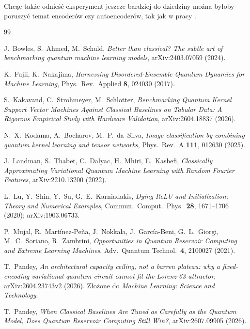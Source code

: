 \documentclass[11pt, a4paper]{article}
\begin{document}
Chcąc także odnieść eksperyment jeszcze bardziej do dziedziny można byłoby poruszyć temat encoderów czy autoencoderów, tak jak w pracy \citet{mari2019}.

\begin{thebibliography}{99}

J.~Bowles, S.~Ahmed, M.~Schuld,
\emph{Better than classical? The subtle art of benchmarking quantum machine learning models},
arXiv:2403.07059 (2024).

K.~Fujii, K.~Nakajima,
\emph{Harnessing Disordered-Ensemble Quantum Dynamics for Machine Learning},
Phys.\ Rev.\ Applied \textbf{8}, 024030 (2017).

S.~Kakavand, C.~Strohmeyer, M.~Schlotter,
\emph{Benchmarking Quantum Kernel Support Vector Machines Against Classical Baselines on Tabular Data: A Rigorous Empirical Study with Hardware Validation},
arXiv:2604.18837 (2026).

N.~X.~Kodama, A.~Bocharov, M.~P.~da~Silva,
\emph{Image classification by combining quantum kernel learning and tensor networks},
Phys.\ Rev.\ A \textbf{111}, 012630 (2025).

J.~Landman, S.~Thabet, C.~Dalyac, H.~Mhiri, E.~Kashefi,
\emph{Classically Approximating Variational Quantum Machine Learning with Random Fourier Features},
arXiv:2210.13200 (2022).

L.~Lu, Y.~Shin, Y.~Su, G.~E.~Karniadakis,
\emph{Dying ReLU and Initialization: Theory and Numerical Examples},
Commun.\ Comput.\ Phys.\ \textbf{28}, 1671--1706 (2020); arXiv:1903.06733.

P.~Mujal, R.~Martínez-Peña, J.~Nokkala, J.~García-Beni, G.~L.~Giorgi, M.~C.~Soriano, R.~Zambrini,
\emph{Opportunities in Quantum Reservoir Computing and Extreme Learning Machines},
Adv.\ Quantum Technol.\ \textbf{4}, 2100027 (2021).

T.~Pandey,
\emph{An architectural capacity ceiling, not a barren plateau: why a fixed-encoding variational quantum circuit cannot fit the Lorenz-63 attractor},
arXiv:2604.23743v2 (2026). Złożone do \emph{Machine Learning: Science and Technology}.

T.~Pandey,
\emph{When Classical Baselines Are Tuned as Carefully as the Quantum Model, Does Quantum Reservoir Computing Still Win?},
arXiv:2607.09905 (2026).


\end{thebibliography}
\end{document}
